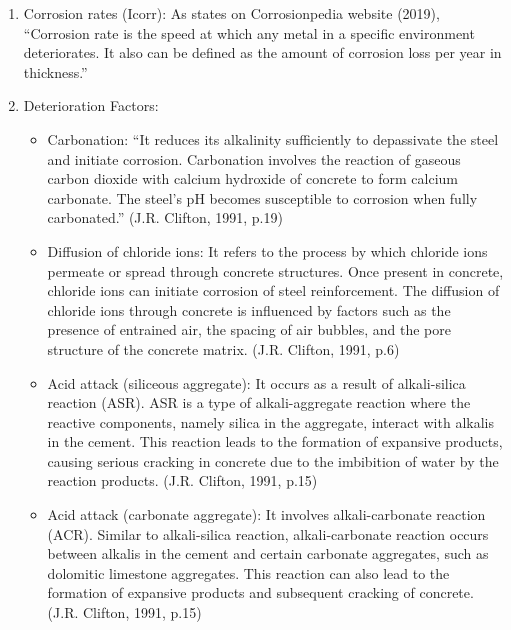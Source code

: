 \documentclass[12pt]{article}
\begin{document}
\begin{enumerate}
    \item Corrosion rates (Icorr): As states on Corrosionpedia \cite{corrosionpedia} website (2019), “Corrosion rate is the speed at which any metal in a specific environment deteriorates. It also can be defined as the amount of corrosion loss per year in thickness.”

    \item Deterioration Factors:
    \begin{itemize}
        \item Carbonation: “It reduces its alkalinity sufficiently to depassivate the steel and initiate corrosion. Carbonation involves the reaction of gaseous carbon dioxide with calcium hydroxide of concrete to form calcium carbonate. The steel's pH becomes susceptible to corrosion when fully carbonated.” (J.R. Clifton, 1991, p.19)\cite{concrete_life_1991}
    \end{itemize}
    \begin{itemize}
        \item Diffusion of chloride ions: It refers to the process by which chloride ions permeate or spread through concrete structures. Once present in concrete, chloride ions can initiate corrosion of steel reinforcement. The diffusion of chloride ions through concrete is influenced by factors such as the presence of entrained air, the spacing of air bubbles, and the pore structure of the concrete matrix. (J.R. Clifton, 1991, p.6)\cite{concrete_life_1991}
    \end{itemize}
    \begin{itemize}
        \item Acid attack (siliceous aggregate): It occurs as a result of alkali-silica reaction (ASR). ASR is a type of alkali-aggregate reaction where the reactive components, namely silica in the aggregate, interact with alkalis in the cement. This reaction leads to the formation of expansive products, causing serious cracking in concrete due to the imbibition of water by the reaction products. (J.R. Clifton, 1991, p.15)\cite{concrete_life_1991}
    \end{itemize}
    \begin{itemize}
        \item Acid attack (carbonate aggregate): It involves alkali-carbonate reaction (ACR). Similar to alkali-silica reaction, alkali-carbonate reaction occurs between alkalis in the cement and certain carbonate aggregates, such as dolomitic limestone aggregates. This reaction can also lead to the formation of expansive products and subsequent cracking of concrete.(J.R. Clifton, 1991, p.15)\cite{concrete_life_1991}

\end{itemize}
\end{enumerate}
\end{document}
